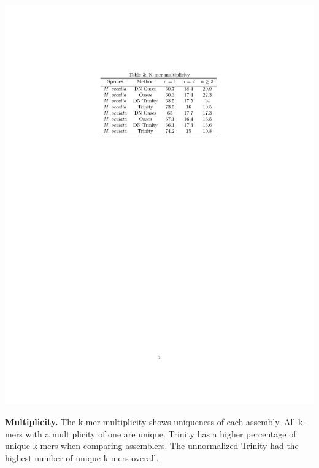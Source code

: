 \begin{table}[tbp]
\centering
\includegraphics[width=0.4\linewidth]{manuscript/Table_3_multiplicity.pdf}
\caption{\textbf{Multiplicity.} The k-mer multiplicity shows uniqueness of each assembly. All k-mers with a multiplicity of one are unique. Trinity has a higher percentage of unique k-mers when comparing assemblers. The unnormalized Trinity had the highest number of unique k-mers overall.}
\label{fig:multiplicity}
\end{table}

